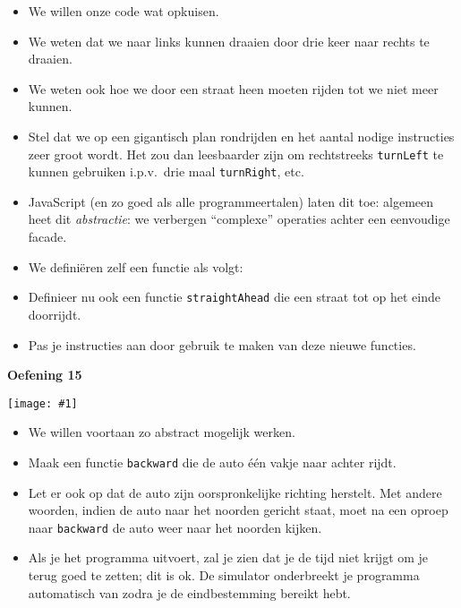 \documentclass[a4paper]{article}
\newcommand{\newexercise}[1]{\clearpage\begin{center}\Huge\bf #1\end{center}}
\newcommand{\exercisemap}[1]{\begin{center}\texttt{[image: \#1]}\end{center}}
\newcommand{\code}[1]{
  \begin{center}
    \begin{minipage}{.8\linewidth}
      
    \end{minipage}
  \end{center}
}
\begin{document}
\begin{itemize}
  \item We willen onze code wat opkuisen.
  \item We weten dat we naar links kunnen draaien door drie keer naar rechts te draaien.
  \item We weten ook hoe we door een straat heen moeten rijden tot we niet meer kunnen.
  \item Stel dat we op een gigantisch plan rondrijden en het aantal nodige
        instructies zeer groot wordt. Het zou dan leesbaarder zijn om rechtstreeks
        \verb'turnLeft' te kunnen gebruiken i.p.v.\ drie maal \verb'turnRight', etc.
  \item JavaScript (en zo goed als alle programmeertalen) laten dit toe:
        algemeen heet dit \emph{abstractie}: we verbergen ``complexe'' operaties
        achter een eenvoudige facade.
  \item We defini\"eren zelf een functie als volgt:
        \code{turnleft.js}
  \item Definieer nu ook een functie \verb'straightAhead' die een straat tot op het einde doorrijdt.
  \item Pas je instructies aan door gebruik te maken van deze nieuwe functies.
\end{itemize}


\newexercise{Oefening 15}
\exercisemap{ex15}
\begin{itemize}
  \item We willen voortaan zo abstract mogelijk werken.
  \item Maak een functie \verb'backward' die de auto \'e\'en vakje naar achter rijdt.
  \item Let er ook op dat de auto zijn oorspronkelijke richting herstelt. Met andere
        woorden, indien de auto naar het noorden gericht staat, moet na een
        oproep naar \verb'backward' de auto weer naar het noorden kijken.
  \item Als je het programma uitvoert, zal je zien dat je de tijd niet krijgt
        om je terug goed te zetten; dit is ok. De simulator onderbreekt je
        programma automatisch van zodra je de eindbestemming bereikt hebt.
\end{itemize}
\end{document}
